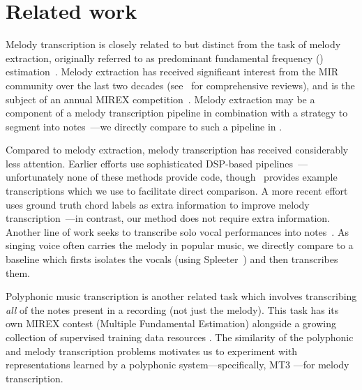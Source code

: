\section{Related work}\label{sec:related}

Melody transcription is closely related to but distinct from the task of melody extraction, originally referred to as predominant fundamental frequency (\fnot) estimation~\cite{goto1999real,goto2004real}. 
Melody extraction has received significant interest from the MIR community over the last two decades (see~\cite{salamon2014melody,rao2022melody} for comprehensive reviews), 
and is the subject of an annual MIREX competition~\cite{downie2014ten}. 
Melody extraction may be a component of a melody transcription pipeline in combination with a strategy to segment \fnot{} into notes~\cite{salamon2015midi,nishikimi2016musical,nishikimi2017scale}---we directly compare to such a pipeline in .

Compared to melody extraction, melody transcription has received considerably less attention. 
Earlier efforts use sophisticated DSP-based pipelines~\cite{paiva2004auditory,paiva2005detection,ryynanen2008automatic,weil2009automatic}---unfortunately none of these methods provide code, though~\cite{ryynanen2008automatic} provides example transcriptions which we use to facilitate direct comparison. 
A more recent effort uses ground truth chord labels as extra information to improve melody transcription~\cite{laaksonen2014automatic}---in contrast, our method does not require extra information. 
Another line of work seeks to transcribe solo vocal performances into notes~\cite{molina2014sipth,mauch2015computer,nishikimi2020bayesian,nishikimi2021audio}. 
As singing voice often carries the melody in popular music, we directly compare to a baseline which firsts isolates the vocals (using Spleeter~\cite{hennequin2020spleeter}) and then transcribes them.

Polyphonic music transcription is another related task which involves transcribing \emph{all} of the notes present in a recording (not just the melody).
This task has its own MIREX contest (Multiple Fundamental \fnot{} Estimation) alongside a growing collection of supervised training data resources \cite{benetos2013automatic,thickstun2017learning,hawthorne2019enabling,manilow2019cutting}. 
The similarity of the polyphonic and melody transcription problems motivates us to experiment with representations learned by a polyphonic system---specifically, MT3 \cite{gardner2021mt3}---for melody transcription.